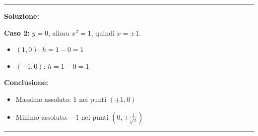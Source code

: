 \documentclass[12pt, a4paper]{article}
\newenvironment{solution}
{\par\noindent\rule{\textwidth}{0.4pt}\par\textbf{Soluzione:}\medskip\par}
{\par\rule{\textwidth}{0.4pt}\par\bigskip}
\begin{document}
\begin{solution}
\textbf{Caso 2:} $y = 0$, allora $x^2 = 1$, quindi $x = \pm 1$.
\begin{itemize}
    \item $(1, 0)$: $h = 1 - 0 = 1$
    \item $(-1, 0)$: $h = 1 - 0 = 1$
\end{itemize}

\textbf{Conclusione:}
\begin{itemize}
    \item Massimo assoluto: $1$ nei punti $(\pm 1, 0)$
    \item Minimo assoluto: $-1$ nei punti $(0, \pm\frac{1}{\sqrt{2}})$
\end{itemize}
\end{solution}
\end{document}
